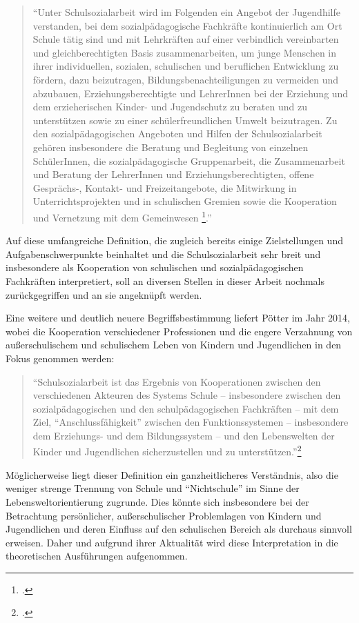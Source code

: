 \begin{quotation}
\noindent
"`Unter Schulsozialarbeit wird im Folgenden ein Angebot der Jugendhilfe verstanden, bei dem sozialpädagogische Fachkräfte kontinuierlich am Ort Schule tätig sind und mit Lehrkräften auf einer verbindlich vereinbarten und gleichberechtigten Basis zusammenarbeiten, um junge Menschen in ihrer individuellen, sozialen, schulischen und beruflichen Entwicklung zu fördern, dazu beizutragen, Bildungsbenachteiligungen zu vermeiden und abzubauen, Erziehungsberechtigte und LehrerInnen bei der Erziehung und dem erzieherischen Kinder- und Jugendschutz zu beraten und zu unterstützen sowie zu einer schülerfreundlichen Umwelt beizutragen. Zu den sozialpädagogischen Angeboten und Hilfen der Schulsozialarbeit gehören insbesondere die Beratung und Begleitung von einzelnen SchülerInnen, die sozialpädagogische Gruppenarbeit, die Zusammenarbeit und Beratung der LehrerInnen und Erziehungsberechtigten, offene Gesprächs-, Kontakt- und Freizeitangebote, die Mitwirkung in Unterrichtsprojekten und in schulischen Gremien sowie die Kooperation und Vernetzung mit dem Gemeinwesen \footcite[28]{Speck2007}."'
\end{quotation}

Auf diese umfangreiche Definition, die zugleich bereits einige Zielstellungen und Aufgabenschwerpunkte beinhaltet und die Schulsozialarbeit sehr breit und insbesondere als Kooperation von schulischen und sozialpädagogischen Fachkräften interpretiert, soll an diversen Stellen in dieser Arbeit nochmals zurückgegriffen und an sie angeknüpft werden. 

Eine weitere und deutlich neuere Begriffsbestimmung liefert Pötter im Jahr 2014, wobei die Kooperation verschiedener Professionen und die engere Verzahnung von außerschulischem und schulischem Leben von Kindern und Jugendlichen in den Fokus genommen werden:

\begin{quotation}
\noindent
"`Schulsozialarbeit ist das Ergebnis von Kooperationen zwischen den verschiedenen Akteuren des Systems Schule -- insbesondere zwischen den sozialpädagogischen und den schulpädagogischen Fachkräften -- mit dem Ziel, "`Anschlussfähigkeit"' zwischen den Funktionssystemen -- insbesondere dem Erziehungs- und dem Bildungssystem -- und den Lebenswelten der Kinder und Jugendlichen sicherzustellen und zu unterstützen."'\footcite[23]{Poetter2014}
\end{quotation}

Möglicherweise liegt dieser Definition ein ganzheitlicheres Verständnis, also die weniger strenge Trennung von Schule und "`Nichtschule"' im Sinne der Lebensweltorientierung zugrunde. Dies könnte sich insbesondere bei der Betrachtung persönlicher, außerschulischer Problemlagen von Kindern und Jugendlichen und deren Einfluss auf den schulischen Bereich als durchaus sinnvoll erweisen. Daher und aufgrund ihrer Aktualität wird diese Interpretation in die theoretischen Ausführungen aufgenommen.
 
